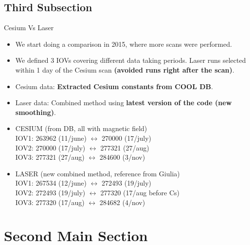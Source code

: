 \documentclass{beamer}
\begin{document}
\subsection{Third Subsection} 	
\begin{frame}{Cesium Vs Laser}
 \begin{itemize}
     \item  We	start doing	a comparison in	2015, where	more scans were	performed.
     \item   We	defined	3 IOVs covering	different data taking periods. Laser runs selected	within 1 day of the	Cesium	scan \textbf{(avoided runs right after the scan)}.
    \item Cesium data: \textbf{Extracted Cesium	constants from COOL	DB}.
    \item Laser	data: Combined method using	\textbf{latest version of the code (new	smoothing)}.
    \item CESIUM (from DB, all with magnetic field)	
    \\IOV1:	263962 (11/june) $\leftrightarrow$ 270000 (17/july)
    \\IOV2:	270000 (17/july) $\leftrightarrow$ 277321 (27/aug)
    \\IOV3:	277321 (27/aug) $\leftrightarrow$ 284600 (3/nov)
    \item LASER	(new combined method, reference	from Giulia)
    \\IOV1:	267534 (12/june) $\leftrightarrow$ 272493 (19/july)
    \\IOV2:	272493 (19/july) $\leftrightarrow$ 277320 (17/aug	before	Cs)	
    \\IOV3:	277320 (17/aug) $\leftrightarrow$ 284682 (4/nov)
 \end{itemize}
	
\end{frame}
\section{Second Main Section}
\end{document}
